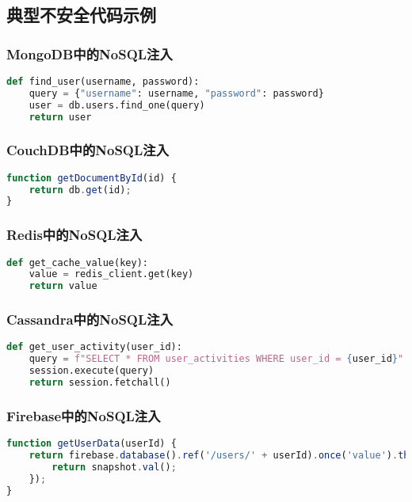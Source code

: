\documentclass{article}
\begin{document}
\subsection{典型不安全代码示例}

\subsubsection{MongoDB中的NoSQL注入}
\begin{lstlisting}[language=Python, caption=存在NoSQL注入漏洞的代码]
def find_user(username, password):
    query = {"username": username, "password": password}
    user = db.users.find_one(query)
    return user
\end{lstlisting}

\subsubsection{CouchDB中的NoSQL注入}
\begin{lstlisting}[language=JavaScript, caption=存在NoSQL注入漏洞的CouchDB代码]
function getDocumentById(id) {
    return db.get(id);
}
\end{lstlisting}

\subsubsection{Redis中的NoSQL注入}
\begin{lstlisting}[language=Python, caption=Redis中的NoSQL注入]
def get_cache_value(key):
    value = redis_client.get(key)
    return value
\end{lstlisting}

\subsubsection{Cassandra中的NoSQL注入}
\begin{lstlisting}[language=Python, caption=Cassandra中的NoSQL注入]
def get_user_activity(user_id):
    query = f"SELECT * FROM user_activities WHERE user_id = {user_id}"
    session.execute(query)
    return session.fetchall()
\end{lstlisting}

\subsubsection{Firebase中的NoSQL注入}
\begin{lstlisting}[language=JavaScript, caption=Firebase中的NoSQL注入]
function getUserData(userId) {
    return firebase.database().ref('/users/' + userId).once('value').then(function(snapshot) {
        return snapshot.val();
    });
}
\end{lstlisting}
\end{document}
